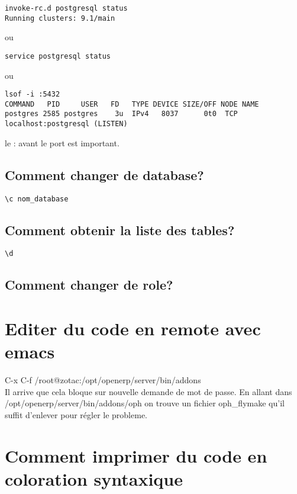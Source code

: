 \documentclass[12pt,a4paper]{article}
\begin{document}
\begin{verbatim}
invoke-rc.d postgresql status
Running clusters: 9.1/main 
\end{verbatim}

ou
\begin{verbatim}
service postgresql status
\end{verbatim}
ou
\begin{verbatim}
lsof -i :5432
COMMAND   PID     USER   FD   TYPE DEVICE SIZE/OFF NODE NAME
postgres 2585 postgres    3u  IPv4   8037      0t0  TCP localhost:postgresql (LISTEN)
\end{verbatim}

le : avant le port est important.

\subsection{Comment changer de database?}
\label{sec:ch_database}

\begin{verbatim}
\c nom_database
\end{verbatim}

\subsection{Comment obtenir la liste des tables?}
\label{sec:table_list}

\begin{verbatim}
\d
\end{verbatim}

\subsection{Comment changer de role?}
\label{sec:role}

\section{Editer du code en remote avec emacs}
\label{sec:emacs-remote}

C-x C-f /root@zotac:/opt/openerp/server/bin/addons \\
Il arrive que cela bloque sur nouvelle demande de mot de passe. En allant dans /opt/openerp/server/bin/addons/oph on trouve un fichier oph\_flymake qu'il suffit d'enlever pour régler le probleme.

\section{Comment imprimer du code en coloration syntaxique}
\label{sec:print_color}
\end{document}
